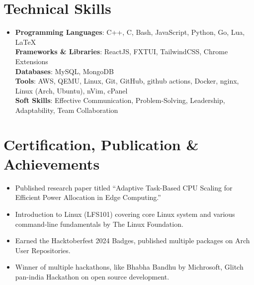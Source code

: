 \documentclass[letterpaper,10pt]{article}
\newcommand{\resumeItem}[1]{\item\small{#1 \vspace{-2pt}}}
\newcommand{\resumeItemListStart}{\begin{itemize}}
\newcommand{\resumeItemListEnd}{\end{itemize}\vspace{-5pt}}
\begin{document}
\section{Technical Skills}

\begin{itemize}[leftmargin=0.15in, label={}]
  \item{
    \small{
      \textbf{Programming Languages}{: C++, C, Bash, JavaScript, Python, Go, Lua, LaTeX} \\
      \textbf{Frameworks \& Libraries}{: ReactJS, FXTUI, TailwindCSS, Chrome Extensions} \\
      \textbf{Databases}{: MySQL, MongoDB} \\
      \textbf{Tools}{: AWS, QEMU, Linux, Git, GitHub, github actions, Docker, nginx, Linux (Arch, Ubuntu), nVim, cPanel} \\
      \textbf{Soft Skills}{: Effective Communication, Problem-Solving, Leadership, Adaptability, Team Collaboration}
    }
  }
\end{itemize}

\section{Certification, Publication \& Achievements}
\resumeItemListStart
  \resumeItem{Published research paper titled “Adaptive Task-Based CPU Scaling for Efficient Power Allocation in Edge Computing.”}
  \resumeItem{Introduction to Linux (LFS101) covering core Linux system and various command-line fundamentals by The Linux Foundation.}
  \resumeItem{Earned the Hacktoberfest 2024 Badges, published multiple packages on Arch User Repositories.}
  \resumeItem{Winner of multiple hackathons, like Bhabha Bandhu by Michrosoft, Glitch pan-india Hackathon on open source development.}
\resumeItemListEnd
\end{document}
